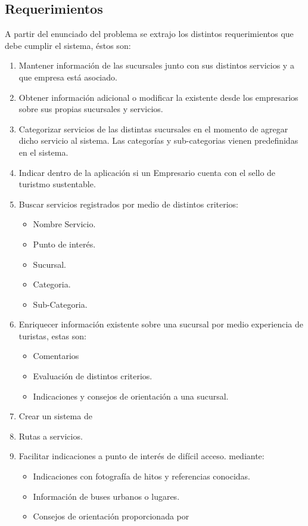 \documentclass[11pt]{article}
\begin{document}
\subsection{Requerimientos}
A partir del enunciado del problema se extrajo los distintos requerimientos que debe cumplir el sistema, éstos son:
\begin{enumerate}
\item Mantener información de las sucursales junto con sus distintos servicios y a que empresa está asociado.
\item Obtener información adicional o modificar la existente desde los empresarios sobre sus propias sucursales y servicios.
\item Categorizar servicios de las distintas sucursales en el momento de agregar dicho servicio al sistema. Las categorías y sub-categorias vienen predefinidas en el sistema.
\item Indicar dentro de la aplicación si un Empresario cuenta con el sello de turistmo sustentable.
\item Buscar servicios registrados por medio de distintos criterios:
	\begin{itemize}
		\item Nombre Servicio.
		\item Punto de interés.
		\item Sucursal.
		\item Categoria.
		\item Sub-Categoria.
	\end{itemize}
\item Enriquecer información existente sobre una sucursal por medio experiencia de turistas, estas son:
	\begin{itemize}
		\item Comentarios
		\item Evaluación de distintos criterios.
		\item Indicaciones y consejos de orientación a una sucursal.
	\end{itemize}
\item Crear un sistema de 
\item Rutas a servicios.
\item Facilitar indicaciones a punto de interés de difícil acceso. mediante:
	\begin{itemize}
		\item Indicaciones con fotografía de hitos y referencias conocidas.
		\item Información de buses urbanos o lugares.
		\item Consejos de orientación proporcionada por

\end{itemize}
\end{enumerate}
\end{document}

